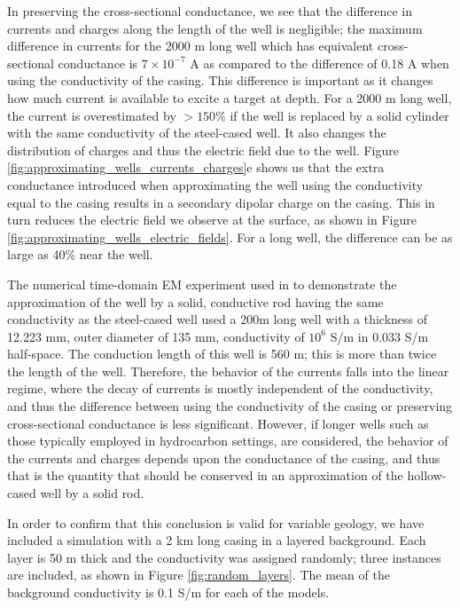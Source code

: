 \documentclass[extra,mreferee]{gji}
\begin{document}
In preserving the cross-sectional conductance, we see that the difference in currents and charges along the length of the well is negligible;  the maximum difference in currents for the 2000 m long well which has equivalent cross-sectional conductance is $7\times10^{-7}$ A as compared to the difference of 0.18 A when using the conductivity of the casing. This difference is important as it changes how much current is available to excite a target at depth. For a 2000 m long well, the current is overestimated by $> 150\%$ if the well is replaced by a solid cylinder with the same conductivity of the steel-cased well. It also changes the distribution of charges and thus the electric field due to the well. Figure \ref{fig:approximating_wells_currents_charges}e shows us that the extra conductance introduced when approximating the well using the conductivity equal to the casing results in a secondary dipolar charge on the casing. This in turn reduces the electric field we observe at the surface, as shown in Figure \ref{fig:approximating_wells_electric_fields}. For a long well, the difference can be as large as 40\% near the well.



The numerical time-domain EM experiment used in \cite{Um2015} to demonstrate the approximation of the well by a solid, conductive rod having the same conductivity as the steel-cased well used a 200m long well with a thickness of 12.223 mm, outer diameter of 135 mm, conductivity of $10^{6}$ S/m in 0.033 S/m half-space. The conduction length of this well is 560 m; this is more than twice the length of the well. Therefore, the behavior of the currents falls into the linear regime, where the decay of currents is mostly independent of the conductivity, and thus the difference between using the conductivity of the casing or preserving cross-sectional conductance is less significant. However, if longer wells such as those typically employed in hydrocarbon settings, are considered, the behavior of the currents and charges depends upon the conductance of the casing, and thus that is the quantity that should be conserved in an approximation of the hollow-cased well by a solid rod.

In order to confirm that this conclusion is valid for variable geology, we have included a simulation with a 2 km long casing in a layered background. Each layer is 50 m thick and the conductivity was assigned randomly; three instances are included, as shown in Figure \ref{fig:random_layers}. The mean of the background conductivity is 0.1 S/m for each of the models.
\end{document}

